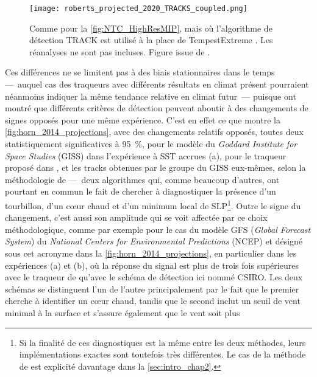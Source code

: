 \documentclass[../main.tex]{subfiles}
\begin{document}
\begin{figure}[htbp]
    \centering
    \texttt{[image: roberts\_projected\_2020\_TRACKS\_coupled.png]}
    \caption{Comme pour la \cref{fig:NTC_HighResMIP}, mais où l'algorithme de détection TRACK \parencite{hodges_how_2017} est utilisé à la place de
    TempestExtreme \parencite{ullrich_tempestextremes_2017,zarzycki_assessing_2017}. Les réanalyses ne sont pas incluses. Figure issue de
    \cite{roberts_projected_2020}.}
    \label{fig:NTC_HighResMIP_TRACK}
\end{figure}

Ces différences ne se limitent pas à des biais stationnaires dans le temps ---~auquel cas des traqueurs avec différents résultats en climat présent pourraient
néanmoins indiquer la même tendance relative en climat futur~--- puisque \cite{horn_tracking_2014} ont montré que différents critères de détection peuvent
aboutir à des changements de signes opposés pour une même expérience. C'est en effet ce que montre la \cref{fig:horn_2014_projections}, avec des changements
relatifs opposés, toutes deux statistiquement significatives à \SI{95}{\percent}, pour le modèle du \textit{Goddard Institute for Space Studies} (GISS) dans
l'expérience à SST accrues (a), pour le traqueur proposé dans \cite{zhao_simulations_2009}, et les tracks obtenues par le groupe du GISS eux-mêmes, selon la
méthodologie de \cite{camargo_improving_2002} ---~deux algorithmes qui, comme beaucoup d'autres, ont pourtant en commun le fait de chercher à diagnostiquer la
présence d'un tourbillon, d'un cœur chaud et d'un minimum local de SLP\footnote{Si la finalité de ces diagnostiques est la même entre les deux méthodes, leurs
implémentations exactes sont toutefois très différentes. Le cas de la méthode de \cite{camargo_improving_2002} est explicité davantage dans la
\cref{sec:intro_chap2}.}. Outre le signe du changement, c'est aussi son amplitude qui se voit affectée par ce choix méthodologique, comme par exemple
pour le cas du modèle GFS (\textit{Global Forecast System}) du \textit{National Centers for Environmental Predictions} (NCEP) et désigné sous cet acronyme dans
la \cref{fig:horn_2014_projections}, en particulier dans les expériences (a) et (b), où la réponse du signal est plus de trois fois supérieures avec le traqueur
de \cite{zhao_simulations_2009} qu'avec le schéma de détection ici nommé CSIRO. Les deux schémas se distinguent l'un de l'autre principalement par le fait que
le premier cherche à identifier un cœur chaud, tandis que le second inclut un seuil de vent minimal à la surface et s'assure également que le vent soit plus
\end{document}
